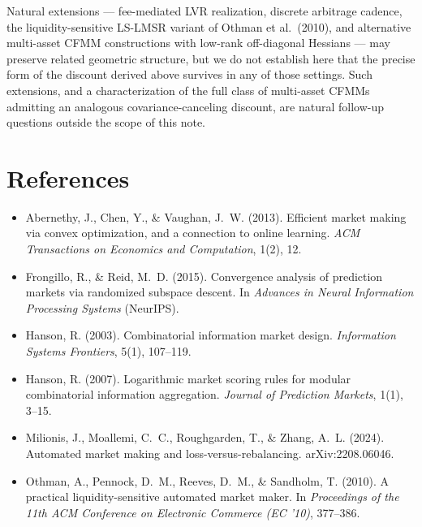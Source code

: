 \documentclass[11pt]{article}
\begin{document}
Natural extensions --- fee-mediated LVR realization, discrete arbitrage cadence, the liquidity-sensitive LS-LMSR variant of Othman et al.\ (2010), and alternative multi-asset CFMM constructions with low-rank off-diagonal Hessians --- may preserve related geometric structure, but we do not establish here that the precise form of the discount derived above survives in any of those settings. Such extensions, and a characterization of the full class of multi-asset CFMMs admitting an analogous covariance-canceling discount, are natural follow-up questions outside the scope of this note.

\section*{References}

\begin{itemize}\setlength{\itemsep}{0pt}
\item Abernethy, J., Chen, Y., \& Vaughan, J.~W. (2013). Efficient market making via convex optimization, and a connection to online learning. \emph{ACM Transactions on Economics and Computation}, 1(2), 12.
\item Frongillo, R., \& Reid, M.~D. (2015). Convergence analysis of prediction markets via randomized subspace descent. In \emph{Advances in Neural Information Processing Systems} (NeurIPS).
\item Hanson, R. (2003). Combinatorial information market design. \emph{Information Systems Frontiers}, 5(1), 107--119.
\item Hanson, R. (2007). Logarithmic market scoring rules for modular combinatorial information aggregation. \emph{Journal of Prediction Markets}, 1(1), 3--15.
\item Milionis, J., Moallemi, C.~C., Roughgarden, T., \& Zhang, A.~L. (2024). Automated market making and loss-versus-rebalancing. arXiv:2208.06046.
\item Othman, A., Pennock, D.~M., Reeves, D.~M., \& Sandholm, T. (2010). A practical liquidity-sensitive automated market maker. In \emph{Proceedings of the 11th ACM Conference on Electronic Commerce (EC '10)}, 377--386.
\end{itemize}
\end{document}
